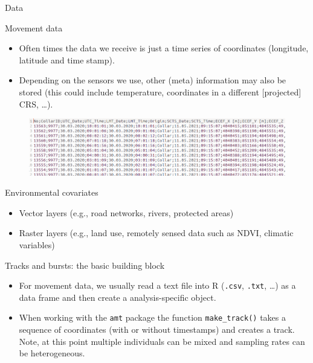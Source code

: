 \documentclass[ignorenonframetext,,t]{beamer}
\providecommand{\tightlist}{%
\setlength{\itemsep}{0pt}\setlength{\parskip}{0pt}}
\providecommand{\tightlist}{%
\setlength{\itemsep}{0pt}\setlength{\parskip}{0pt}}
\renewcommand{\tightlist}{\setlength{\itemsep}{1.4ex}\setlength{\parskip}{0pt}}
\begin{document}
\begin{frame}{Data}
\label{data}
\begin{block}{Movement data}
\label{movement-data}
\begin{itemize}
\tightlist
\item
  Often times the data we receive is just a time series of coordinates
  (longitude, latitude and time stamp).
\item
  Depending on the sensors we use, other (meta) information may also be
  stored (this could include temperature, coordinates in a different
  {[}projected{]} CRS, \ldots).
\end{itemize}

\begin{figure}

{\centering \includegraphics[width=0.85\linewidth]{../img/relocs} 

}

\end{figure}
\end{block}
\end{frame}

\begin{frame}
\begin{block}{Environmental covariates}
\label{environmental-covariates}
\begin{itemize}
\tightlist
\item
  Vector layers (e.g., road networks, rivers, protected areas)
\item
  Raster layers (e.g., land use, remotely sensed data such as NDVI,
  climatic variables)
\end{itemize}
\end{block}
\end{frame}

\begin{frame}[fragile]{Tracks and bursts: the basic building block}
\label{tracks-and-bursts-the-basic-building-block}
\begin{itemize}
\item
  For movement data, we usually read a text file into R (\texttt{.csv},
  \texttt{.txt}, \ldots) as a data frame and then create a
  analysis-specific object.
\item
  When working with the \texttt{amt} package the function
  \texttt{make\_track()} takes a sequence of coordinates (with or
  without timestamps) and creates a track. Note, at this point multiple
  individuals can be mixed and sampling rates can be heterogeneous.
\end{itemize}
\end{frame}
\end{document}
